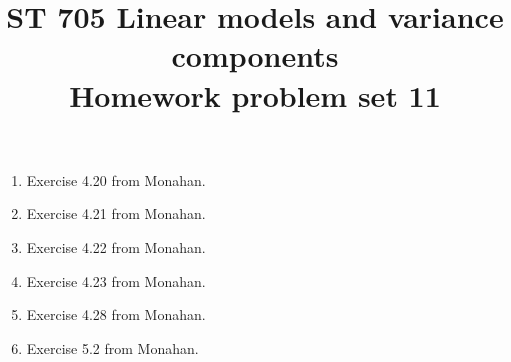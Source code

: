 \documentclass[11pt]{article}
\title{ST 705 Linear models and variance components \\ 
        Homework problem set 11}
\begin{document}
\maketitle

\begin{enumerate}

\item Exercise 4.20 from Monahan.

\item Exercise 4.21 from Monahan.

\item Exercise 4.22 from Monahan.

\item Exercise 4.23 from Monahan.

\item Exercise 4.28 from Monahan.

\item Exercise 5.2 from Monahan.




\end{enumerate}
\end{document}

